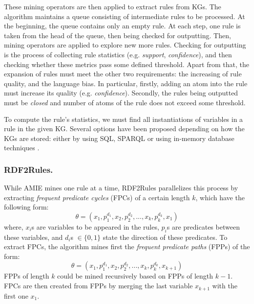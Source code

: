 These mining operators are then applied to extract rules from KGs. The algorithm maintains a queue consisting of intermediate rules to be processed. At the beginning, the queue contains only an empty rule. At each step, one rule is taken from the head of the queue, then being checked for outputting. Then, mining operators are applied to explore new more rules.
Checking for outputting is the process of collecting rule statistics (e.g. \textit{support}, \textit{confidence}), and then checking whether these metrics pass some defined threshold. Apart from that, the expansion of rules must meet the other two requirements: the increasing of rule quality, and the language bias. In particular, firstly, adding an atom into the rule must increase its quality (e.g. \textit{confidence}). Secondly, the rules being outputted must be \textit{closed} and number of atoms of the rule does not exceed some threshold.

To compute the rule's statistics, we must find all instantiations of variables in a rule in the given KG. Several options have been proposed depending on how the KGs are stored: either by using SQL, SPARQL or using in-memory database techniques \cite{amie}.

\subsubsection{RDF2Rules.}
While AMIE mines one rule at a time, RDF2Rules \cite{rdf2rules} parallelizes this process by extracting \emph{frequent predicate cycles} (FPCs) of %
a certain length $k$, which have the following form:
\[\theta = (x_1, p_1^{d_1}, x_2, p_2^{d_2}, ...,x_k, p_k^{d_k}, x_1)\]
where, $x_i$s are variables to be appeared in the rules, $p_i$s are predicates between these variables, and $d_i$s $\in \{0,1\}$ state the direction of these predicates. To extract FPCs, the algorithm mines first the \emph{frequent predicate paths} (FPPs) of the form:
\[\theta = (x_1, p_1^{d_1}, x_2, p_2^{d_2}, ...,x_k, p_k^{d_k}, x_{k+1})\]
FPPs of length $k$ could be mined recursively based on FPPs of length $k-1$. FPCs are then created from FPPs by merging the last variable $x_{k+1}$ with the first one $x_1$.


